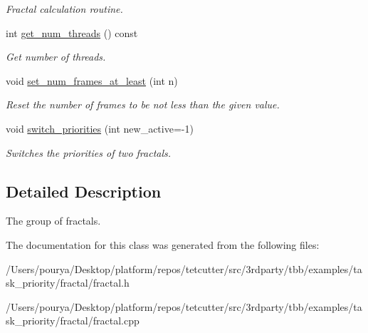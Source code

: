 \begin{DoxyCompactItemize}
\begin{DoxyCompactList}\small\item\em Fractal calculation routine. \end{DoxyCompactList}\item 
\hypertarget{classfractal__group_a307d38e21f5d6b35209e73ebb3ce3983}{}int \hyperlink{classfractal__group_a307d38e21f5d6b35209e73ebb3ce3983}{get\+\_\+num\+\_\+threads} () const \label{classfractal__group_a307d38e21f5d6b35209e73ebb3ce3983}

\begin{DoxyCompactList}\small\item\em Get number of threads. \end{DoxyCompactList}\item 
\hypertarget{classfractal__group_a723b2bd98025116dd27ab66b1bae5547}{}void \hyperlink{classfractal__group_a723b2bd98025116dd27ab66b1bae5547}{set\+\_\+num\+\_\+frames\+\_\+at\+\_\+least} (int n)\label{classfractal__group_a723b2bd98025116dd27ab66b1bae5547}

\begin{DoxyCompactList}\small\item\em Reset the number of frames to be not less than the given value. \end{DoxyCompactList}\item 
\hypertarget{classfractal__group_ab4bd9af427b00729a097df1e45df03ba}{}void \hyperlink{classfractal__group_ab4bd9af427b00729a097df1e45df03ba}{switch\+\_\+priorities} (int new\+\_\+active=-\/1)\label{classfractal__group_ab4bd9af427b00729a097df1e45df03ba}

\begin{DoxyCompactList}\small\item\em Switches the priorities of two fractals. \end{DoxyCompactList}\end{DoxyCompactItemize}


\subsection{Detailed Description}
The group of fractals. 

The documentation for this class was generated from the following files\+:\begin{DoxyCompactItemize}
\item 
/\+Users/pourya/\+Desktop/platform/repos/tetcutter/src/3rdparty/tbb/examples/task\+\_\+priority/fractal/fractal.\+h\item 
/\+Users/pourya/\+Desktop/platform/repos/tetcutter/src/3rdparty/tbb/examples/task\+\_\+priority/fractal/fractal.\+cpp\end{DoxyCompactItemize}
